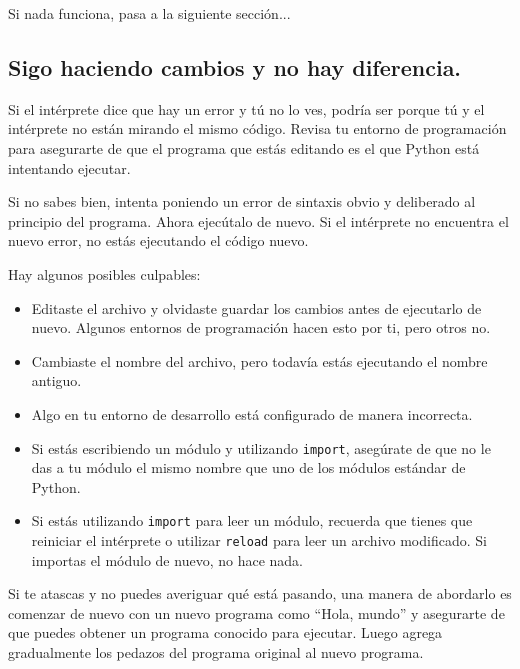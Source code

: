 \documentclass[10pt]{book}
\begin{document}
Si nada funciona, pasa a la siguiente sección...


\subsection{Sigo haciendo cambios y no hay diferencia.}

Si el intérprete dice que hay un error y tú no lo ves,
podría ser porque tú y el intérprete no están mirando el mismo
código.  Revisa tu entorno de programación para asegurarte de que el
programa que estás editando es el que Python está intentando ejecutar.

Si no sabes bien, intenta poniendo un error de sintaxis obvio y deliberado
al principio del programa.  Ahora ejecútalo de nuevo.  Si el
intérprete no encuentra el nuevo error, no estás ejecutando el
código nuevo.

Hay algunos posibles culpables:

\begin{itemize}

\item Editaste el archivo y olvidaste guardar los cambios antes de
ejecutarlo de nuevo.  Algunos entornos de programación hacen esto
por ti, pero otros no.

\item Cambiaste el nombre del archivo, pero todavía estás ejecutando
el nombre antiguo.

\item Algo en tu entorno de desarrollo está configurado
de manera incorrecta.

\item Si estás escribiendo un módulo y utilizando {\tt import},
asegúrate de que no le das a tu módulo el mismo nombre que uno
de los módulos estándar de Python.

\item Si estás utilizando {\tt import} para leer un módulo, recuerda
que tienes que reiniciar el intérprete o utilizar {\tt reload}
para leer un archivo modificado.  Si importas el módulo de nuevo,
no hace nada.

\end{itemize}

Si te atascas y no puedes averiguar qué está pasando, una
manera de abordarlo es comenzar de nuevo con un nuevo programa como ``Hola, mundo''
y asegurarte de que puedes obtener un programa conocido para ejecutar.  Luego agrega gradualmente
los pedazos del programa original al nuevo programa.
\end{document}
